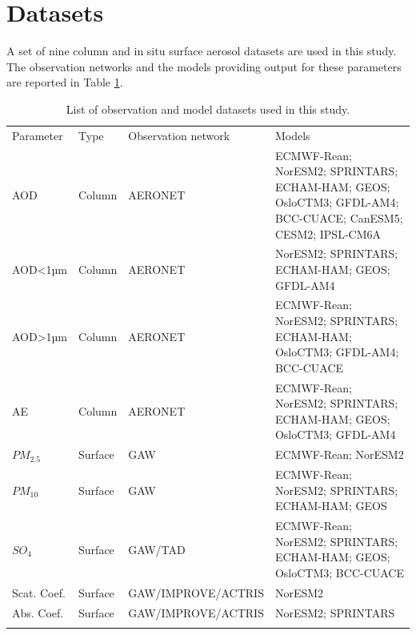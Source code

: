 \documentclass[journal abbreviation, manuscript]{copernicus}
\begin{document}
\section{Datasets}
A set of nine column and in situ surface aerosol datasets are used in this study. The observation networks and the models providing output for these parameters are reported in Table \ref{table:datasets}.

\begin{table}
 \begin{tabularx}{\textwidth}{lllX}
  \tophline
  Parameter   & Type    & Observation network & Models                                                                                                    \\
  \middlehline
  AOD         & Column  & AERONET             & ECMWF-Rean; NorESM2; SPRINTARS; ECHAM-HAM; GEOS; OsloCTM3; GFDL-AM4; BCC-CUACE; CanESM5; CESM2; IPSL-CM6A \\
  AOD<1µm     & Column  & AERONET             & NorESM2; SPRINTARS; ECHAM-HAM; GEOS; GFDL-AM4                                                             \\
  AOD>1µm     & Column  & AERONET             & ECMWF-Rean; NorESM2; SPRINTARS; ECHAM-HAM; OsloCTM3; GFDL-AM4; BCC-CUACE                                  \\
  AE          & Column  & AERONET             & ECMWF-Rean; NorESM2; SPRINTARS; ECHAM-HAM; GEOS; OsloCTM3; GFDL-AM4                                       \\
  $PM_{2.5}$  & Surface & GAW                 & ECMWF-Rean; NorESM2                                                                                       \\
  $PM_{10}$   & Surface & GAW                 & ECMWF-Rean; NorESM2; SPRINTARS; ECHAM-HAM; GEOS                                                           \\
  $SO_{4}$    & Surface & GAW/TAD             & ECMWF-Rean; NorESM2; SPRINTARS; ECHAM-HAM; GEOS; OsloCTM3; BCC-CUACE                                      \\
  Scat. Coef. & Surface & GAW/IMPROVE/ACTRIS  & NorESM2                                                                                                   \\
  Abs. Coef.  & Surface & GAW/IMPROVE/ACTRIS  & NorESM2; SPRINTARS                                                                                        \\
  \bottomhline
 \end{tabularx}
 \caption{List of observation and model datasets used in this study.}
 \label{table:datasets}
\end{table}
\end{document}
